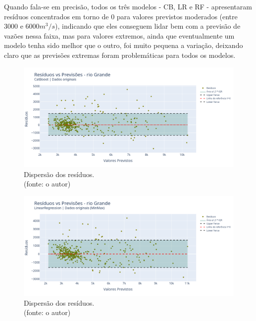 Quando fala-se em precisão, todos os três modelos - CB, LR e RF - apresentaram resíduos concentrados em torno de $0$ para valores previstos moderados (entre $3000$ e $6000 m^3/s$), indicando que eles conseguem lidar bem com a previsão de vazões nessa faixa, mas para valores extremos, ainda que eventualmente um modelo tenha sido melhor que o outro, foi muito pequena a variação, deixando claro que as previsões extremas foram problemáticas para todos os modelos.

\begin{figure}[!h]
	\centering
	\includegraphics[scale=0.33]{Figuras/rio_grande/wfv/CB/CB_WFV_ORIG_RESID_x_PREV.png}
	\caption{Dispersão dos resíduos.\\(fonte: o autor)}
	\label{fig:grande_CB_WFV_ORIG_RESID_x_PREV}
\end{figure}

\begin{figure}[!h]
	\centering
	\includegraphics[scale=0.33]{Figuras/rio_grande/wfv/LR/LR_WFV_ORIG_RESID_x_PREV.png}
	\caption{Dispersão dos resíduos.\\(fonte: o autor)}
	\label{fig:grande_LR_WFV_ORIG_RESID_x_PREV}
\end{figure}

